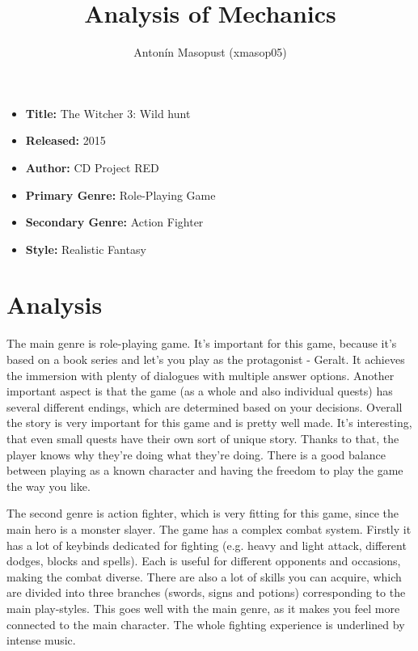 \documentclass[a4paper,10pt,english]{article}
\title{%
Analysis of Mechanics%
}
\author{%
Antonín Masopust (xmasop05)%
}
\date{}
\begin{document}
\maketitle
\thispagestyle{empty}

{%
\large

\begin{itemize}

\item[] \textbf{Title:} The Witcher 3: Wild hunt

\item[] \textbf{Released:} 2015

\item[] \textbf{Author:} CD Project RED

\item[] \textbf{Primary Genre:} Role-Playing Game

\item[] \textbf{Secondary Genre:} Action Fighter

\item[] \textbf{Style:} Realistic Fantasy

\end{itemize}

}

\section*{\centering Analysis}

The main genre is role-playing game. It's important for this game, because it's based on a book series and let's you play as the protagonist - Geralt. It achieves the immersion with plenty of dialogues with multiple answer options. Another important aspect is that the game (as a whole and also individual quests) has several different endings, which are determined based on your decisions. Overall the story is very important for this game and is pretty well made. It's interesting, that even small quests have their own sort of unique story. Thanks to that, the player knows why they're doing what they're doing. There is a good balance between playing as a known character and having the freedom to play the game the way you like.

The second genre is action fighter, which is very fitting for this game, since the main hero is a monster slayer. The game has a complex combat system. Firstly it has a lot of keybinds dedicated for fighting (e.g. heavy and light attack, different dodges, blocks and spells). Each is useful for different opponents and occasions, making the combat diverse. There are also a lot of skills you can acquire, which are divided into three branches (swords, signs and potions) corresponding to the main play-styles. This goes well with the main genre, as it makes you feel more connected to the main character. The whole fighting experience is underlined by intense music.
\end{document}
